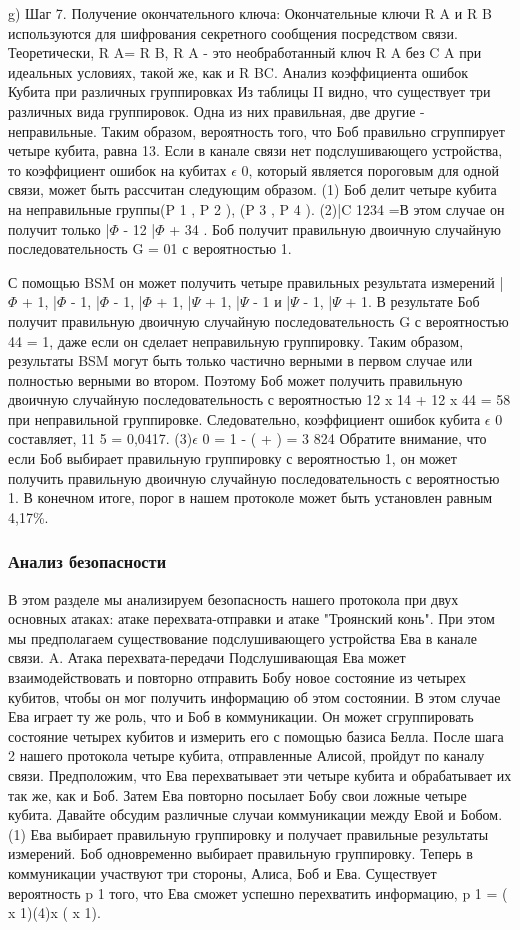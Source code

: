 g) Шаг 7. Получение окончательного ключа: Окончательные ключи R A и R B используются для шифрования секретного сообщения посредством связи. Теоретически, R A= R B, R A - это необработанный ключ R A без C A при идеальных условиях, такой же, как и R BC. Анализ коэффициента ошибок Кубита при различных группировках Из таблицы II видно, что существует три различных вида группировок. Одна из них правильная, две другие - неправильные. Таким образом, вероятность того, что Боб правильно сгруппирует четыре кубита, равна 13.
Если в канале связи нет подслушивающего устройства, то коэффициент ошибок на кубитах $\epsilon$ 0, который является пороговым для одной связи, может быть рассчитан следующим образом.
(1) Боб делит четыре кубита на неправильные группы{(P 1 , P 2 ), (P 3 , P 4 )}.
(2)|C 1234 =В этом случае он получит только |$\Phi$ - 12 |$\Phi$ + 34 . Боб получит правильную двоичную случайную последовательность G = 01 с вероятностью 1.

С помощью BSM он может получить четыре правильных результата измерений {|$\Phi$ + 1, |$\Phi$ - 1}, {|$\Phi$ - 1, |$\Phi$ + 1}, {|$\Psi$ + 1, |$\Psi$ - 1} и {|$\Psi$ - 1, |$\Psi$ + 1}. В результате Боб получит правильную двоичную случайную последовательность G с вероятностью 44 = 1, даже если он сделает неправильную группировку.
Таким образом, результаты BSM могут быть только частично верными в первом случае или полностью верными во втором.
Поэтому Боб может получить правильную двоичную случайную последовательность с вероятностью 12 x 14 + 12 x 44 = 58 при неправильной группировке. Следовательно, коэффициент ошибок кубита $\epsilon$ 0 составляет, 11 5 = 0,0417. (3)$\epsilon$ 0 = 1 - ( + ) = 3 824
Обратите внимание, что если Боб выбирает правильную группировку с вероятностью 1, он может получить правильную двоичную случайную последовательность с вероятностью 1. В конечном итоге, порог в нашем протоколе может быть установлен равным 4,17\%.

\subsubsection{Анализ безопасности}
В этом разделе мы анализируем безопасность нашего протокола при двух основных атаках: атаке перехвата-отправки и атаке "Троянский конь". При этом мы предполагаем существование подслушивающего устройства Ева в канале связи.
A. Атака перехвата-передачи Подслушивающая Ева может взаимодействовать и повторно отправить Бобу новое состояние из четырех кубитов, чтобы он мог получить информацию об этом состоянии. В этом случае Ева играет ту же роль, что и Боб в коммуникации. Он может сгруппировать состояние четырех кубитов и измерить его с помощью базиса Белла.
После шага 2 нашего протокола четыре кубита, отправленные Алисой, пройдут по каналу связи. Предположим, что Ева перехватывает эти четыре кубита и обрабатывает их так же, как и Боб. Затем Ева повторно посылает Бобу свои ложные четыре кубита. Давайте обсудим различные случаи коммуникации между Евой и Бобом.
(1) Ева выбирает правильную группировку и получает правильные результаты измерений. Боб одновременно выбирает правильную группировку. Теперь в коммуникации участвуют три стороны, Алиса, Боб и Ева. Существует вероятность p 1 того, что Ева сможет успешно перехватить информацию, p 1 = ( x 1)(4)x ( x 1).

